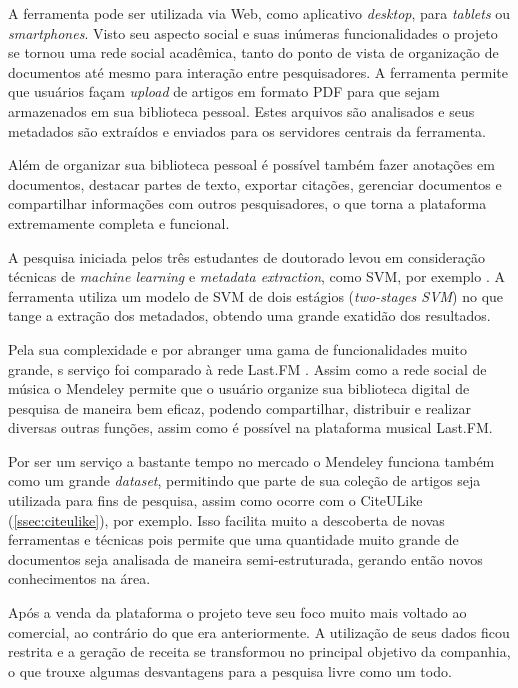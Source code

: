 A ferramenta pode ser utilizada via Web, como aplicativo \emph{desktop}, para \emph{tablets} ou \emph{smartphones}. Visto seu aspecto social e suas inúmeras funcionalidades o projeto se tornou uma rede social acadêmica, tanto do ponto de vista de organização de documentos até mesmo para interação entre pesquisadores. A ferramenta permite que usuários façam \emph{upload} de artigos em formato PDF para que sejam armazenados em sua biblioteca pessoal. Estes arquivos são analisados e seus metadados são extraídos e enviados para os servidores centrais da ferramenta.

Além de organizar sua biblioteca pessoal é possível também fazer anotações em documentos, destacar partes de texto, exportar citações, gerenciar documentos e compartilhar informações com outros pesquisadores, o que torna a plataforma extremamente completa e funcional.

A pesquisa iniciada pelos três estudantes de doutorado levou em consideração técnicas de \emph{machine learning} e \emph{metadata extraction}, como SVM, por exemplo \cite{Granitzer-2012-LayoutBased}. A ferramenta utiliza um modelo de SVM de dois estágios (\emph{two-stages SVM}) \cite{Han-SVM} no que tange a extração dos metadados, obtendo uma grande exatidão dos resultados.

Pela sua complexidade e por abranger uma gama de funcionalidades muito grande, s serviço foi comparado à rede Last.FM \cite{Mendeley-LastFM}. Assim como a rede social de música o Mendeley permite que o usuário organize sua biblioteca digital de pesquisa de maneira bem eficaz, podendo compartilhar, distribuir e realizar diversas outras funções, assim como é possível na plataforma musical Last.FM.

Por ser um serviço a bastante tempo no mercado o Mendeley funciona também como um grande \emph{dataset}, permitindo que parte de sua coleção de artigos seja utilizada para fins de pesquisa, assim como ocorre com o CiteULike (\autoref{ssec:citeulike}), por exemplo. Isso facilita muito a descoberta de novas ferramentas e técnicas pois permite que uma quantidade muito grande de documentos seja analisada de maneira semi-estruturada, gerando então novos conhecimentos na área.

Após a venda da plataforma o projeto teve seu foco muito mais voltado ao comercial, ao contrário do que era anteriormente. A utilização de seus dados ficou restrita e a geração de receita se transformou no principal objetivo da companhia, o que trouxe algumas desvantagens para a pesquisa livre como um todo.

